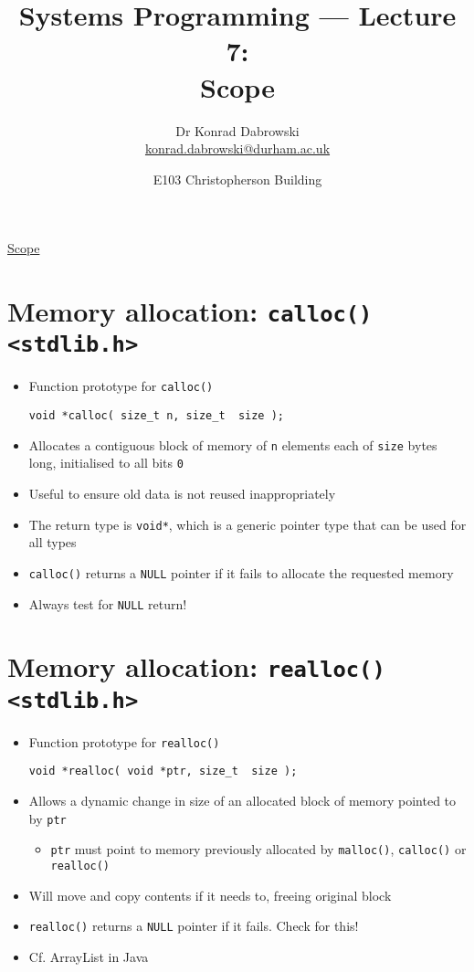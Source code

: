 \documentclass{article}
\title{Systems Programming --- Lecture 7:\\
Scope}
\author{Dr Konrad Dabrowski\\
\href{mailto://konrad.dabrowski@durham.ac.uk}{konrad.dabrowski@durham.ac.uk}
}
\date{E103 Christopherson Building\\
\scalebox{0.38}{\hspace*{-3cm}\texttt{[image: code.jpg]}\hspace*{-3cm}}
}
\begin{document}
\begin{center}
	\underline{\huge Scope}
\end{center}



\section{Memory allocation: \texttt{calloc() <stdlib.h>}}
\begin{itemize}
\item Function prototype for \verb!calloc()!
\begin{verbatim}
void *calloc( size_t n, size_t  size );
\end{verbatim}
\item Allocates a contiguous block of memory of \verb!n! elements each of \verb!size! bytes long, initialised to all bits \verb!0!

\item Useful to ensure old data is not reused inappropriately

\item The return type is \verb!void*!, which is a generic pointer type that can be used for all types

\item \verb!calloc()! returns a \verb!NULL! pointer if it fails to allocate the requested memory
\item Always test for \verb!NULL! return!
\end{itemize}



\section{Memory allocation: \texttt{realloc() <stdlib.h>}}
\begin{itemize}
\item Function prototype for \verb!realloc()!
\begin{verbatim}
void *realloc( void *ptr, size_t  size );
\end{verbatim}

\item Allows a dynamic change in size of an allocated block of memory pointed to by \verb!ptr!
\begin{itemize}
\item \verb!ptr! must point to memory previously allocated by \verb!malloc()!, \verb!calloc()! or \verb!realloc()!
\end{itemize}

\item Will move and copy contents if it needs to, freeing original block
\item \verb!realloc()! returns a \verb!NULL! pointer if it fails. Check for this!
\item Cf. ArrayList in Java
\end{itemize}
\end{document}
